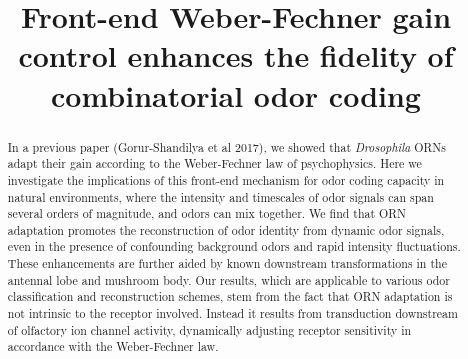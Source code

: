 \documentclass[10pt,prl,aps,showpacs,twocolumn,unsortedaddress]{revtex4-1}
\begin{document}
\title{Front-end Weber-Fechner gain control enhances the fidelity of combinatorial odor coding}





\begin{abstract}
    In a previous paper (Gorur-Shandilya et al 2017), we showed that \textit{Drosophila} ORNs adapt their gain according to the Weber-Fechner law of psychophysics.  Here we investigate the implications of this front-end mechanism for odor coding capacity in natural environments, where the intensity and timescales of odor signals can span several orders of magnitude, and odors can mix together. We find that ORN adaptation promotes the reconstruction of odor identity from dynamic odor signals, even in the presence of confounding background odors and rapid intensity fluctuations. These enhancements are further aided by known downstream transformations in the antennal lobe and mushroom body. Our results, which are applicable to various odor classification and reconstruction schemes, stem from the fact that ORN adaptation is not intrinsic to the receptor involved. Instead it results from transduction downstream of olfactory ion channel activity, dynamically adjusting receptor sensitivity in accordance with the Weber-Fechner law. 
    
    
    
\end{abstract}
\end{document}
